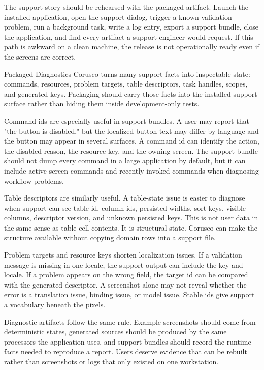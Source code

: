 The support story should be rehearsed with the packaged artifact. Launch the installed application, open the support dialog, trigger a known validation problem, run a background task, write a log entry, export a support bundle, close the application, and find every artifact a support engineer would request. If this path is awkward on a clean machine, the release is not operationally ready even if the screens are correct.

\begin{coruscobox}{Packaged Diagnostics}
Corusco turns many support facts into inspectable state: commands, resources, problem targets, table descriptors, task handles, scopes, and generated keys. Packaging should carry those facts into the installed support surface rather than hiding them inside development-only tests.
\end{coruscobox}

Command ids are especially useful in support bundles. A user may report that "the button is disabled," but the localized button text may differ by language and the button may appear in several surfaces. A command id can identify the action, the disabled reason, the resource key, and the owning screen. The support bundle should not dump every command in a large application by default, but it can include active screen commands and recently invoked commands when diagnosing workflow problems.

Table descriptors are similarly useful. A table-state issue is easier to diagnose when support can see table id, column ids, persisted widths, sort keys, visible columns, descriptor version, and unknown persisted keys. This is not user data in the same sense as table cell contents. It is structural state. Corusco can make the structure available without copying domain rows into a support file.

Problem targets and resource keys shorten localization issues. If a validation message is missing in one locale, the support output can include the key and locale. If a problem appears on the wrong field, the target id can be compared with the generated descriptor. A screenshot alone may not reveal whether the error is a translation issue, binding issue, or model issue. Stable ids give support a vocabulary beneath the pixels.

Diagnostic artifacts follow the same rule. Example screenshots should come from deterministic states, generated sources should be produced by the same processors the application uses, and support bundles should record the runtime facts needed to reproduce a report. Users deserve evidence that can be rebuilt rather than screenshots or logs that only existed on one workstation.

